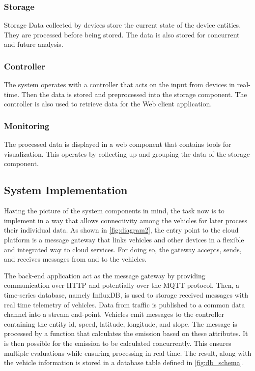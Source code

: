 \documentclass[letter, 10pt, conference]{ieeeconf}
\begin{document}
\subsubsection{Storage}

Storage Data collected by devices store the current state of the device entities.
They are processed before being stored.
The data is also stored for concurrent and future analysis.

\subsubsection{Controller}

The system operates with a controller that acts on the input from devices in real-time.
Then the data is stored and preprocessed into the storage component.
The controller is also used to retrieve data for the Web client application.

\subsubsection{Monitoring}

The processed data is displayed in a web component that contains tools for visualization.
This operates by collecting up and grouping the data of the storage component.

\subsection{System Implementation}

Having the picture of the system components in mind, the task now is to implement in a way that allows connectivity among the vehicles for later process their individual data.
As shown in \ref{fig:diagram2}, the entry point to the cloud platform is a message gateway that links vehicles and other devices in a flexible and integrated way to cloud services.
For doing so, the gateway accepts, sends, and receives messages from and to the vehicles.

The back-end application act as the message gateway by providing communication over HTTP and potentially over the MQTT protocol.
Then, a time-series database, namely InfluxDB, is used to storage received messages with real time telemetry of vehicles.
Data from traffic is published to a common data channel into a stream end-point.
Vehicles emit messages to the controller containing the entity id, speed, latitude, longitude, and slope.
The message is processed by a function that calculates the emission based on these attributes.
It is then possible for the emission to be calculated concurrently.
This ensures multiple evaluations while ensuring processing in real time.
The result, along with the vehicle information is stored in a database table defined in \ref{fig:db_schema}.
\end{document}
